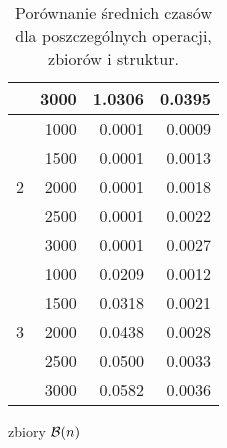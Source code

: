 \begin{table}
\begin{subfigure}{0.5\textwidth}
\begin{tabular}{lrrr}
            & 3000 & 1.0306 & 0.0395 \\
            \midrule
            & 1000 & 0.0001 & 0.0009 \\
            & 1500 & 0.0001 & 0.0013 \\
            2 & 2000 & 0.0001 & 0.0018 \\
            & 2500 & 0.0001 & 0.0022 \\
            & 3000 & 0.0001 & 0.0027 \\
            \midrule
            & 1000 & 0.0209 & 0.0012 \\
            & 1500 & 0.0318 & 0.0021 \\
            3 & 2000 & 0.0438 & 0.0028 \\
            & 2500 & 0.0500 & 0.0033 \\
            & 3000 & 0.0582 & 0.0036 \\
            \bottomrule
        \end{tabular}
        \caption{zbiory $\mathcal B(n)$}
        \label{tab:porównanie czasów B}
    \end{subfigure}
    \caption{Porównanie średnich czasów dla poszczególnych operacji, zbiorów i struktur.}
\end{table}